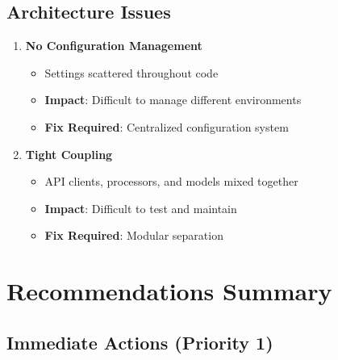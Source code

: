 \documentclass[11pt,a4paper]{article}
\begin{document}
\subsection{Architecture Issues}

\begin{enumerate}
    \item \textbf{No Configuration Management}
    \begin{itemize}
        \item Settings scattered throughout code
        \item \textbf{Impact}: Difficult to manage different environments
        \item \textbf{Fix Required}: Centralized configuration system
    \end{itemize}
    
    \item \textbf{Tight Coupling}
    \begin{itemize}
        \item API clients, processors, and models mixed together
        \item \textbf{Impact}: Difficult to test and maintain
        \item \textbf{Fix Required}: Modular separation
    \end{itemize}
\end{enumerate}

\section{Recommendations Summary}

\subsection{Immediate Actions (Priority 1)}
\end{document}
